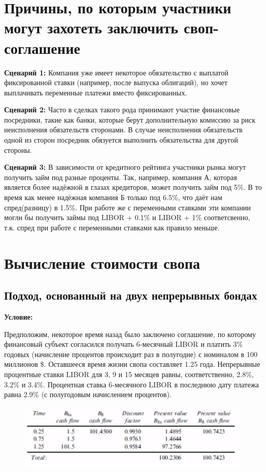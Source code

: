 \documentclass{article}
\begin{document}
\section{Причины, по которым участники могут захотеть заключить своп-соглашение}

\text{}

\textbf{Сценарий 1:} Компания уже имеет некоторое обязательство с выплатой фиксированной ставки (например, после выпуска облигаций), но хочет выплачивать переменные платежи вместо фиксированных.

\textbf{Сценарий 2:} Часто в сделках такого рода принимают участие финансовые посредники, такие как банки, которые берут дополнительную комиссию за риск неисполнения обязательств сторонами. В случае неисполнения обязательств одной из сторон посредник обязуется выполнить обязательства для другой стороны.

\textbf{Сценарий 3:} В зависимости от кредитного рейтинга участники рынка могут получить займ под разные проценты. Так, например, компания А, которая является более надёжной в глазах кредиторов, может получить займ под 5\%. В то время как менее надёжная компания Б только под 6.5\%, что даёт нам спред(разницу) в 1.5\%. При работе же с переменными ставками эти компании могли бы получить займы под LIBOR + 0.1\% и LIBOR + 1\% соответсвенно, т.к. спред при работе с переменными ставками как правило меньше.

\section{Вычисление стоимости свопа}
\subsection{Подход, основанный на двух непрерывных бондах}

\textbf{Условие:}

Предположим, некоторое время назад было заключено соглашение, по которому финансовый субъект согласился получать 6-месячный LIBOR и платить 3\% годовых (начисление процентов происходит раз в полугодие) с номиналом в 100 миллионов \$. Оставшееся время жизни свопа составляет 1.25 года. Непрерывные процентные ставки LIBOR для 3, 9 и 15 месяцев равны, соответственно, 2.8\%, 3.2\% и 3.4\%. Процентная ставка 6-месячного LIBOR в последнюю дату платежа равна 2.9\% (с полугодовым начислением процентов).

\begin{figure}[h]
\centering
\includegraphics{bonds approach.png}
\label{loadings}
\end{figure}
\end{document}
